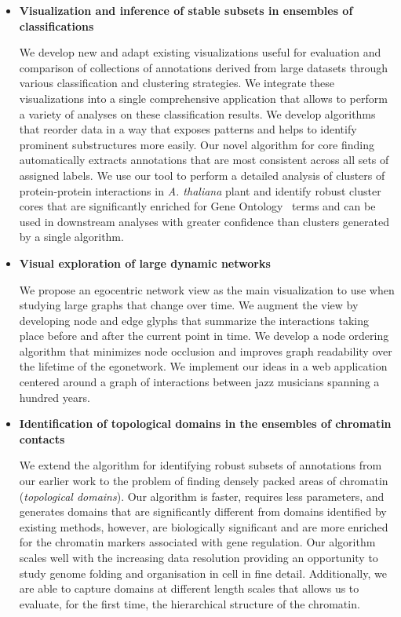 \documentclass[12pt]{cmuthesis}
\begin{document}
\begin{itemize}
  \item \textbf{Visualization and inference of stable subsets in ensembles of classifications}

  We develop new and adapt existing visualizations useful for evaluation and comparison of collections of annotations derived from large datasets through various classification and clustering strategies. We integrate these visualizations into a single comprehensive application that allows to perform a variety of analyses on these classification results. We develop algorithms that reorder data in a way that exposes patterns and helps to identify prominent substructures more easily. Our novel algorithm for core finding automatically extracts annotations that are most consistent across all sets of assigned labels. We use our tool to perform a detailed analysis of clusters of protein-protein interactions in \textit{A. thaliana} plant and identify robust cluster cores that are significantly enriched for Gene Ontology~\cite{GeneOntology} terms and can be used in downstream analyses with greater confidence than clusters generated by a single algorithm.


  \item \textbf{Visual exploration of large dynamic networks}

  We propose an egocentric network view as the main visualization to use when  studying large graphs that change over time. We augment the view by developing node and edge glyphs that summarize the interactions taking place before and after the current point in time. We develop a node ordering algorithm that minimizes node occlusion and improves graph readability over the lifetime of the egonetwork. We implement our ideas in a web application centered around a graph of interactions between jazz musicians spanning a hundred years.

  \item \textbf{Identification of topological domains in the ensembles of chromatin contacts}

  We extend the algorithm for identifying robust subsets of annotations from our earlier work to the problem of finding densely packed areas of chromatin (\textit{topological domains}). Our algorithm is faster, requires less parameters, and generates domains that are significantly different from domains identified by existing methods, however, are biologically significant and are more enriched for the chromatin markers associated with gene regulation. Our algorithm scales well with the increasing data resolution providing an opportunity to study genome folding and organisation in cell in fine detail. Additionally, we are able to capture domains at different length scales that allows us to evaluate, for the first time, the hierarchical structure of the chromatin.


\end{itemize}
\end{document}
